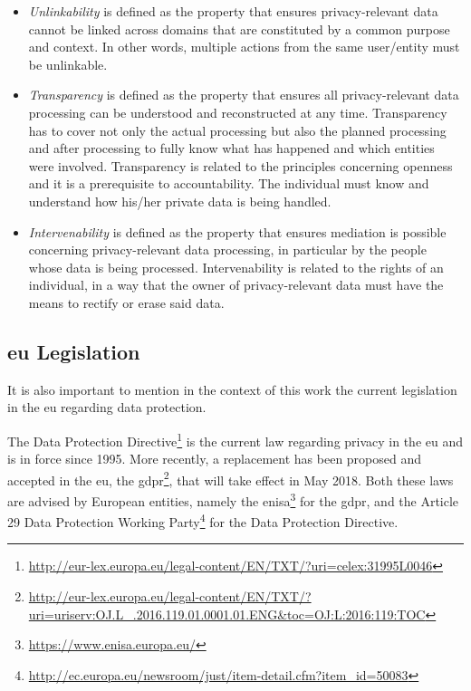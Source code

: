 \begin{itemize}

\item \textit{Unlinkability} is defined as the property that ensures privacy-relevant data cannot be linked across domains that are constituted by a common purpose and context. In other words, multiple actions from the same user/entity must be unlinkable.

\item \textit{Transparency} is defined as the property that ensures all privacy-relevant data processing can be understood and reconstructed at any time. Transparency has to cover not only the actual processing but also the planned processing and after processing to fully know what has happened and which entities were involved. Transparency is related to the principles concerning openness and it is a prerequisite to accountability. The individual must know and understand how his/her private data is being handled.

\item \textit{Intervenability} is defined as the property that ensures mediation is possible concerning privacy-relevant data processing, in particular by the people whose data is being processed. Intervenability is related to the rights of an individual, in a way that the owner of privacy-relevant data must have the means to rectify or erase said data.

\end{itemize}


\subsection{\acl{eu} Legislation}
\label{ssec:EuropeanUnionLegislation}

It is also important to mention in the context of this work the current legislation in the \ac{eu} regarding data protection.

 The Data Protection Directive\footnote{\url{http://eur-lex.europa.eu/legal-content/EN/TXT/?uri=celex:31995L0046}} is the current law regarding privacy in the \ac{eu} and is in force since 1995.
More recently, a replacement has been proposed and accepted in the \ac{eu}, the \ac{gdpr}\footnote{\url{http://eur-lex.europa.eu/legal-content/EN/TXT/?uri=uriserv:OJ.L_.2016.119.01.0001.01.ENG&toc=OJ:L:2016:119:TOC}}, that will take effect in May 2018. Both these laws are advised by European entities, namely the \ac{enisa}\footnote{\url{https://www.enisa.europa.eu/}} for the \ac{gdpr}, and the Article 29 Data Protection Working Party\footnote{\url{http://ec.europa.eu/newsroom/just/item-detail.cfm?item_id=50083}} for the Data Protection Directive.


